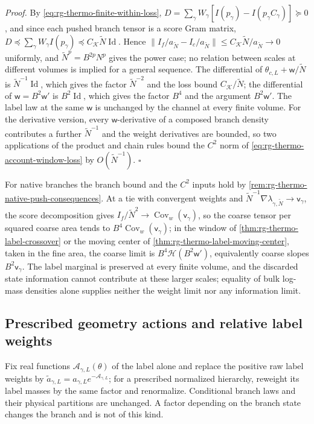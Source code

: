 \noindent\emph{Proof.}
By \cref{eq:rg-thermo-finite-within-loss},
$D=\sum_\gamma W_\gamma[I(p_\gamma)-I(p_\gamma C_\gamma)]\succeq0$, and since
each pushed branch tensor is a score Gram matrix,
$D\preceq\sum_\gamma W_\gamma I(p_\gamma)\preceq C_{\mathcal K}\widetilde N\operatorname{Id}$.
Hence $\|I_f/a_{\widetilde N}-I_c/a_{\widetilde N}\|\leq C_{\mathcal K}\widetilde N/a_{\widetilde N}\to0$
uniformly, and $\widetilde N^p=B^{2p}N^p$ gives the power case; no relation
between scales at different volumes is implied for a general sequence. The
differential of $\theta_{c,L}+\mathsf w/\widetilde N$ is
$\widetilde N^{-1}\operatorname{Id}$, which gives the factor $\widetilde N^{-2}$
and the loss bound $C_{\mathcal K}/\widetilde N$; the differential of
$\mathsf w=B^2\mathsf w'$ is $B^2\operatorname{Id}$, which gives the factor
$B^4$ and the argument $B^2\mathsf w'$. The label law at the same $\mathsf w$
is unchanged by the channel at every finite volume. For the derivative
version, every $\mathsf w$-derivative of a composed branch density contributes
a further $\widetilde N^{-1}$ and the weight derivatives are bounded, so two
applications of the product and chain rules bound the $C^2$ norm of
\cref{eq:rg-thermo-account-window-loss} by $O(\widetilde N^{-1})$. $\square$

For native branches the branch bound and the $C^2$ inputs hold by
\cref{rem:rg-thermo-native-push-consequences}. At a tie with convergent
weights and $\widetilde N^{-1}\nabla\lambda_{\gamma,\widetilde N}\to\mathsf v_\gamma$,
the score decomposition gives $I_f/\widetilde N^2\to\operatorname{Cov}_w(\mathsf v_\gamma)$,
so the coarse tensor per squared coarse area tends to
$B^4\operatorname{Cov}_w(\mathsf v_\gamma)$; in the window of
\cref{thm:rg-thermo-label-crossover} or the moving center of
\cref{thm:rg-thermo-label-moving-center}, taken in the fine area, the coarse
limit is $B^4\mathcal H(B^2\mathsf w')$, equivalently coarse slopes
$B^2\mathsf v_\gamma$. The label marginal is preserved at every finite volume,
and the discarded state information cannot contribute at these larger scales;
equality of bulk log-mass densities alone supplies neither the weight limit
nor any information limit.

\subsection{Prescribed geometry actions and relative label weights}
\label{sec:rg-thermo-account-actions}

Fix real functions $\mathscr A_{\gamma,L}(\theta)$ of the label alone and
replace the positive raw label weights by
$\widetilde a_{\gamma,L}=a_{\gamma,L}e^{-\mathscr A_{\gamma,L}}$; for a
prescribed normalized hierarchy, reweight its label masses by the same factor
and renormalize. Conditional branch laws and their physical partitions are
unchanged. A factor depending on the branch state changes the branch and is
not of this kind.

